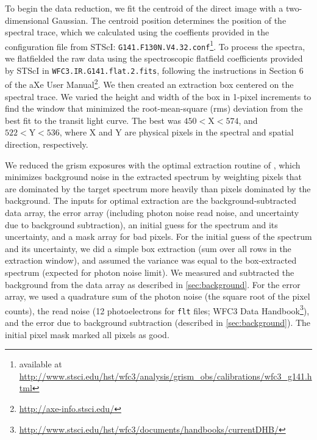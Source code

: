 \documentclass[twocolumn]{aastex62}
\begin{document}
To begin the data reduction, we fit the centroid of the direct image with a two-dimensional Gaussian. The centroid position determines the position of the spectral trace, which we calculated using the coeffients provided in the configuration file from STScI: \texttt{G141.F130N.V4.32.conf}\footnote{available at \url{http://www.stsci.edu/hst/wfc3/analysis/grism_obs/calibrations/wfc3_g141.html}}.  To process the spectra, we flatfielded the raw data using the spectroscopic flatfield coefficients provided by STScI in \texttt{WFC3.IR.G141.flat.2.fits}, following the instructions in Section 6 of the aXe User Manual\footnote{\url{http://axe-info.stsci.edu/}}.  We then created an extraction box centered on the spectral trace. We varied the height and width of the box in 1-pixel increments to find the window that minimized the root-mean-square (rms) deviation from the best fit to the transit light curve.  The best was $450  < \mathrm{X} < 574$, and $522 < \mathrm{Y} < 536$, where X and Y are physical pixels in the spectral and spatial direction, respectively. 

We reduced the grism exposures with the optimal extraction routine of \cite{horne86}, which minimizes background noise in the extracted spectrum by weighting pixels that are dominated by the target spectrum more heavily than pixels dominated by the background.  The inputs for optimal extraction are the background-subtracted data array, the error array (including photon noise read noise, and uncertainty due to background subtraction), an initial guess for the spectrum and its uncertainty, and a mask array for bad pixels.  For the initial guess of the spectrum and its uncertainty, we did a simple box extraction (sum over all rows in the extraction window), and assumed the variance was equal to the box-extracted spectrum (expected for photon noise limit).  We measured and subtracted the background from the data array as described in \ref{sec:background}. For the error array, we used a quadrature sum of the photon noise (the square root of the pixel counts), the read noise (12 photoelectrons for \texttt{flt} files; WFC3 Data Handbook\footnote{\url{http://www.stsci.edu/hst/wfc3/documents/handbooks/currentDHB/}}), and the error due to background subtraction (described in \ref{sec:background}).  The initial pixel mask marked all pixels as good. 
\end{document}
